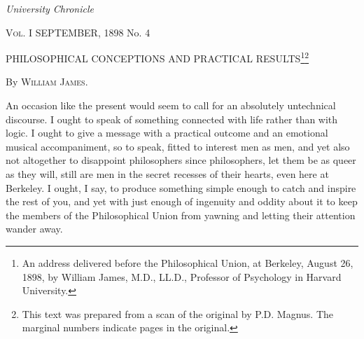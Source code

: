 \documentclass[12pt]{article}
\begin{document}
\setcounter{footnote}{0}

\centerline{\emph{University Chronicle}}

\textsc{Vol}. I \hfill SEPTEMBER, 1898 \hfill No. 4 

\centerline{PHILOSOPHICAL CONCEPTIONS AND 
PRACTICAL RESULTS\footnote{An address delivered before the Philosophical Union, at Berkeley, August 26, 1898, by William James, M.D., LL.D., Professor of Psychology in Harvard University.}\footnote{This text was prepared from a scan of the original by P.D. Magnus. The marginal numbers indicate pages in the original.}}

\centerline{By \textsc{William James}.}


\bigskip
{}
An occasion like the present would seem to call for an absolutely untechnical discourse. I ought to speak of something connected with life rather than with logic. I ought to give a message with a practical outcome and an emotional musical accompaniment, so to speak, fitted to interest men as men, and yet also not altogether to disappoint philosophers since philosophers, let them be as queer as they will, still are men in the secret recesses of their hearts, even here at Berkeley. I ought, I say, to produce something simple enough to catch and inspire the rest of you, and yet with just enough of ingenuity and oddity about it to keep the members of the Philosophical Union from yawning and letting their attention wander away. 
\end{document}
